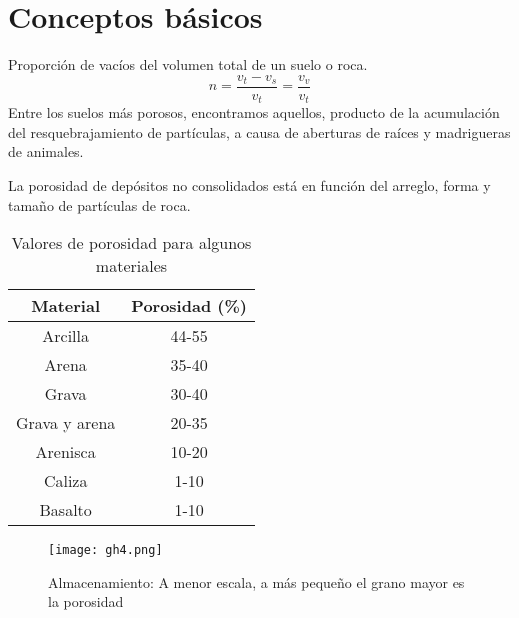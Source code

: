 \section{Conceptos básicos}
\begin{definition}[Porosidad]
    Proporción de vacíos del volumen total de un suelo o roca.
    \begin{equation}
        n = \frac{v_t - v_s}{v_t} = \frac{v_v}{v_t}
    \end{equation}
    Entre los suelos más porosos, encontramos aquellos, producto de la acumulación del resquebrajamiento de partículas, a causa de aberturas de raíces y madrigueras de animales.
\end{definition}
La porosidad de depósitos no consolidados está en función del arreglo, forma y tamaño de partículas de roca.
\begin{table}[h!]
    \centering
    \begin{tabular}{@{}cc@{}}
    \toprule
    Material      & Porosidad (\%) \\ \midrule
    Arcilla       & 44-55          \\
    Arena         & 35-40          \\
    Grava         & 30-40          \\
    Grava y arena & 20-35          \\
    Arenisca      & 10-20          \\
    Caliza        & 1-10           \\
    Basalto        & 1-10           \\ \bottomrule
    \end{tabular}
    \caption{Valores de porosidad para algunos materiales}
    \label{tabgh1}
\end{table}
\begin{figure}[h!]
\centering
  \texttt{[image: gh4.png]}
  \caption{Almacenamiento: A menor escala, a más pequeño el grano mayor es la porosidad }
  \label{gh4}
\end{figure}
